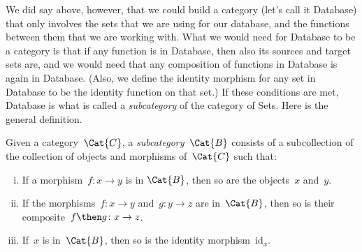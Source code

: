 We did say above, however, that we could build a category (let's call it \textsf{Database}) that only involves the sets that we are using for our database, and the functions between them that we are working with. What we would need for \textsf{Database} to be a category is that if any function is in \textsf{Database}, then also its sources and target sets are, and we would need that any composition of functions in \textsf{Database} is again in \textsf{Database}. (Also, we define the identity morphism for any set in \textsf{Database} to be the identity function on that set.) If these conditions are met, \textsf{Database} is what is called a \emph{subcategory} of the category of Sets. Here is the general definition. 

\begin{shaded*}
\begin{definition}[Subcategory]
\label{def:subcategory}
	Given a category~$\Cat{C}$, a \emph{subcategory}~$\Cat{B}$ consists of a subcollection of the collection of objects and morphisms of~$\Cat{C}$ such that:
	\begin{enumerate}[(i)]
	\item If a morphism~$f \colon x\to y$ is in $\Cat{B}$, then so are the objects~$x$ and~$y$.
	\item If the morphisms~$f\colon x\to y$ and~$g\colon y\to z$ are in~$\Cat{B}$, then so is their composite~$f\then g\colon x\to z$.
	\item If~$x$ is in~$\Cat{B}$, then so is the identity morphism~$\text{id}_x$.
	\end{enumerate}
\end{definition}
\end{shaded*}


